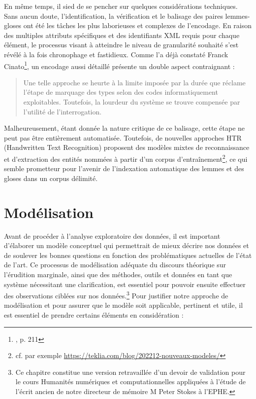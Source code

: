 \documentclass[a4paper, twoside, 12pt]{book}
\begin{document}
En même temps, il sied de se pencher sur quelques considérations techniques. Sans aucun doute, l'identification, la vérification et le balisage des paires lemmes-gloses ont été les tâches les plus laborieuses et complexes de l'encodage. En raison des multiples attributs spécifiques et des identifiants XML requis pour chaque élément, le processus visant à atteindre le niveau de granularité souhaité s'est révélé à la fois chronophage et fastidieux. Comme l'a déjà constaté Franck Cinato\footnote{\cite{cinato2015priscien}, p. 211}, un encodage aussi détaillé présente un double aspect contraignant : \blockquote{Une telle approche se heurte à la limite imposée par la durée que réclame l’étape de marquage des types selon des codes informatiquement exploitables. Toutefois, la lourdeur du système se trouve compensée par l'utilité de l'interrogation.} Malheureusement, étant donnée la nature critique de ce balisage, cette étape ne peut pas être entièrement automatisée. Toutefois, de nouvelles approches HTR (Handwritten Text Recognition) proposent des modèles mixtes de reconnaissance et d'extraction des \og{}entités nommées\fg{} à partir d'un corpus d'entraînement\footnote{cf. par exemple \url{https://teklia.com/blog/202212-nouveaux-modeles/}}, ce qui semble prometteur pour l'avenir de l'indexation automatique des lemmes et des gloses dans un corpus délimité. \\


\section{Modélisation}

Avant de procéder à l'analyse exploratoire des données, il est important d'élaborer un modèle conceptuel qui permettrait de mieux décrire nos données et de soulever les bonnes questions en fonction des problématiques actuelles de l'état de l'art. Ce processus de modélisation adéquate du discours théorique sur l'érudition marginale, ainsi que des méthodes, outils et données en tant que système nécessitant une clarification, est essentiel pour pouvoir ensuite effectuer des observations ciblées sur nos données.\footnote{Ce chapitre constitue une version retravaillée d'un devoir de validation pour le cours \og{} Humanités numériques et computationnelles appliquées à  l’étude de l’écrit ancien\fg{} de notre directeur de mémoire M Peter Stokes à l'EPHE.}
Pour justifier notre approche de modélisation et pour assurer que le modèle soit applicable, pertinent et utile, il est essentiel de prendre certains éléments en considération : 
\end{document}
